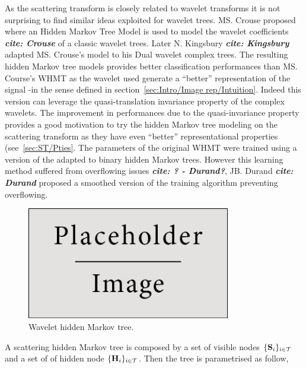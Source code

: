 \documentclass[a4paper,11pt]{report}
\begin{document}
{		As the scattering transform is closely related to wavelet transforms it is not surprising to find similar ideas exploited for wavelet trees. MS. Crouse proposed where an Hidden Markov Tree Model is used to model the wavelet coefficients \textbf{\textit{cite: Crouse}} of a classic wavelet trees. Later N. Kingsbury \textbf{\textit{cite: Kingsbury}} adapted MS. Crouse's model to his Dual wavelet complex trees. The resulting hidden Markov tree models provides better classification performances than MS. Course's WHMT as the wavelet used generate a ``better'' representation of the signal -in the sense defined in section~\ref{sec:Intro/Image rep/Intuition}. Indeed this version can leverage the quasi-translation invariance property of the complex wavelets. The improvement in performances due to the quasi-invariance property provides a good motivation to try the hidden Markov tree modeling on the scattering transform as they have even ``better'' representational properties (see~\ref{sec:ST/Pties}. The parameters of the original WHMT were trained using a version of the  adapted to binary hidden Markov trees. However this learning method suffered from overflowing issues \textbf{\textit{cite: ? - Durand?}}, JB. Durand \textbf{\textit{cite: Durand}} proposed a smoothed version of the training algorithm preventing overflowing.\\
   
		\begin{figure}
				\begin{center}
					\includegraphics[width=3.5in]{placeholder.jpg}
					\caption{Wavelet hidden Markov tree.} %
					\label{fig:WHMT}
				\end{center}
		\end{figure}
	  
	  A scattering hidden Markov tree is composed by a set of visible nodes $\{{\bf S}_{i}\}_{i \in \mathcal{T}}$ and a set of of hidden node $\{{\bf H}_{i}\}_{i \in \mathcal{T}}$. Then the tree is parametrised as follow,
	  
}
\end{document}

